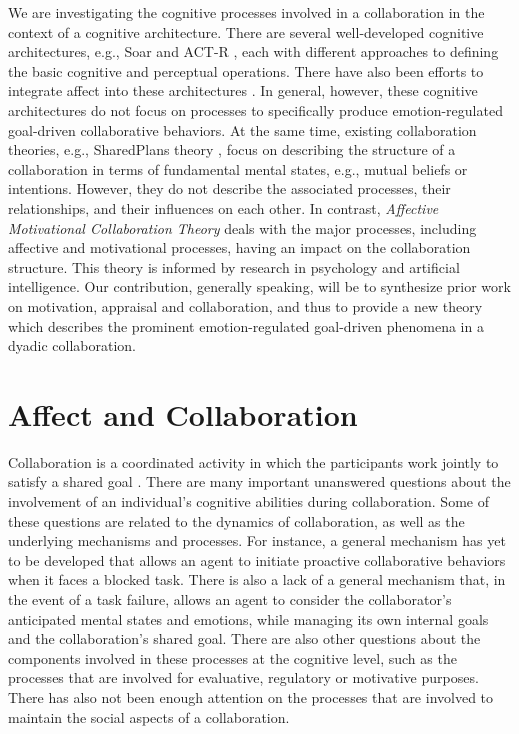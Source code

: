 \documentclass[letterpaper]{article}
\begin{document}
We are investigating the cognitive processes involved in a collaboration in the
context of a cognitive architecture. There are several well-developed cognitive
architectures, e.g., Soar \cite{laird:soar} and ACT-R \cite{anderson:act-r},
each with different approaches to defining the basic cognitive and perceptual
operations. There have also been efforts to integrate affect into these
architectures \cite{dancy:actR-physiology-affect,marinier:behavior-emotion}. In
general, however, these cognitive architectures do not focus on processes to
specifically produce emotion-regulated goal-driven collaborative behaviors. At
the same time, existing collaboration theories, e.g., SharedPlans theory
\cite{grosz:plans-discourse}, focus on describing the structure of a
collaboration in terms of fundamental mental states, e.g., mutual beliefs or
intentions. However, they do not describe the associated processes, their
relationships, and their influences on each other. In contrast,
\textit{Affective Motivational Collaboration Theory} deals with the major
processes, including affective and motivational processes, having an impact on
the collaboration structure. This theory is informed by research in psychology
and artificial intelligence. Our contribution, generally speaking, will be to
synthesize prior work on motivation, appraisal and collaboration, and thus to
provide a new theory which describes the prominent emotion-regulated goal-driven
phenomena in a dyadic collaboration.

\section{Affect and Collaboration}

Collaboration is a coordinated activity in which the participants work jointly
to satisfy a shared goal \cite{grosz:plans-discourse}. There are many important
unanswered questions about the involvement of an individual's cognitive
abilities during collaboration. Some of these questions are related to the
dynamics of collaboration, as well as the underlying mechanisms and processes.
For instance, a general mechanism has yet to be developed that allows an agent
to initiate proactive collaborative behaviors when it faces a blocked task.
There is also a lack of a general mechanism that, in the event of a task
failure, allows an agent to consider the collaborator's anticipated mental
states and emotions, while managing its own internal goals and the
collaboration's shared goal. There are also other questions about the components
involved in these processes at the cognitive level, such as the processes that
are involved for evaluative, regulatory or motivative purposes. There has also
not been enough attention on the processes that are involved to maintain the
social aspects of a collaboration.
\end{document}
